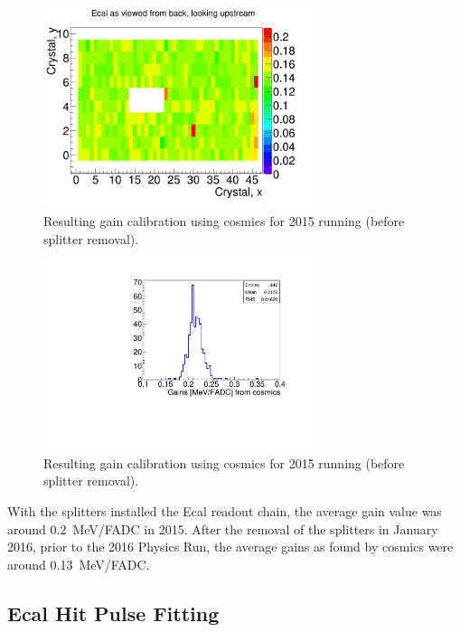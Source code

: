 \documentclass[12pt]{report}
\begin{document}
\begin{figure}[H]
  \centering
      \includegraphics[width=0.7\textwidth]{pics/performance/cosmicGains2015.png}
  \caption[Resulting 2015 gain calibration in the Ecal using cosmic ray muons shown by Ecal module position]{Resulting gain calibration using cosmics for 2015 running (before splitter removal).}
  \label{Figure:cosmicG}
\end{figure}


\begin{figure}[H]
  \centering
      \includegraphics[width=0.7\textwidth]{pics/performance/cosmicGainsMay15.pdf}
  \caption[Distribution of the resulting 2015 gains in the Ecal using cosmic ray muons]{Resulting gain calibration using cosmics for 2015 running (before splitter removal).}
  \label{Figure:cosmicGhisto}
\end{figure}

With the splitters installed the Ecal readout chain, the average gain value was around 0.2~MeV/FADC in 2015. After the removal of the splitters in January 2016, prior to the 2016 Physics Run, the average gains as found by cosmics were around 0.13~MeV/FADC.


\subsection{Ecal Hit Pulse Fitting}
\end{document}
